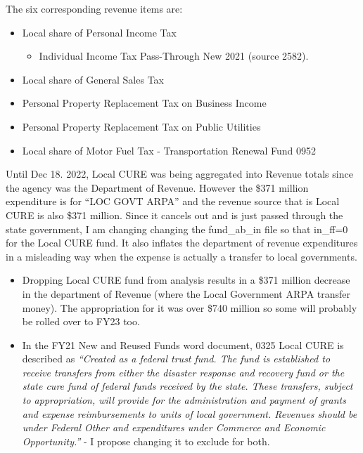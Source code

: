 \documentclass[
  letterpaper,
  DIV=11,
  numbers=noendperiod]{scrreport}
\providecommand{\tightlist}{%
  \setlength{\itemsep}{0pt}\setlength{\parskip}{0pt}}\usepackage{longtable,booktabs,array}
\begin{document}
The six corresponding revenue items are:

\begin{itemize}
\tightlist
\item
  Local share of Personal Income Tax

  \begin{itemize}
  \tightlist
  \item
    Individual Income Tax Pass-Through New 2021 (source 2582).
  \end{itemize}
\item
  Local share of General Sales Tax
\item
  Personal Property Replacement Tax on Business Income
\item
  Personal Property Replacement Tax on Public Utilities
\item
  Local share of Motor Fuel Tax - Transportation Renewal Fund 0952
\end{itemize}

Until Dec 18. 2022, Local CURE was being aggregated into Revenue totals
since the agency was the Department of Revenue. However the \$371
million expenditure is for ``LOC GOVT ARPA'' and the revenue source that
is Local CURE is also \$371 million. Since it cancels out and is just
passed through the state government, I am changing changing the
fund\_ab\_in file so that in\_ff=0 for the Local CURE fund. It also
inflates the department of revenue expenditures in a misleading way when
the expense is actually a transfer to local governments.

\begin{itemize}
\tightlist
\item
  Dropping Local CURE fund from analysis results in a \$371 million
  decrease in the department of Revenue (where the Local Government ARPA
  transfer money). The appropriation for it was over \$740 million so
  some will probably be rolled over to FY23 too.\\
\item
  In the FY21 New and Reused Funds word document, 0325 Local CURE is
  described as \emph{``Created as a federal trust fund. The fund is
  established to receive transfers from either the disaster response and
  recovery fund or the state cure fund of federal funds received by the
  state. These transfers, subject to appropriation, will provide for the
  administration and payment of grants and expense reimbursements to
  units of local government. Revenues should be under Federal Other and
  expenditures under Commerce and Economic Opportunity.''} - I propose
  changing it to exclude for both.
\end{itemize}
\end{document}

